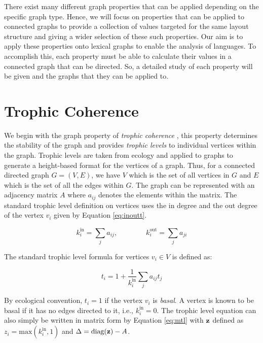 There exist many different graph properties that can be applied depending on the specific graph type. Hence, we will focus on properties that can be applied to connected graphs to provide a collection of values targeted for the same layout structure and giving a wider selection of these such properties. Our aim is to apply these properties onto lexical graphs to enable the analysis of languages. To accomplish this, each property must be able to calculate their values in a connected graph that can be directed. So, a detailed study of each property will be given and the graphs that they can be applied to. 

\section{Trophic Coherence}
We begin with the graph property of \emph{trophic coherence} \cite{johnson2014trophic}, this property determines the stability of the graph and provides \emph{trophic levels} to individual vertices within the graph. Trophic levels are taken from ecology and applied to graphs to generate a height-based format for the vertices of a graph. Thus, for a connected directed graph $G =(V,E)$, we have $V$ which is the set of all vertices in $G$ and $E$ which is the set of all the edges within $G$. The graph can be represented with an adjacency matrix $A$ where $a_{ij}$ denotes the elements within the matrix. The standard trophic level definition on vertices uses the in degree and the out degree of the vertex $v_i$ given by Equation \ref{eq:inoutt}.

\begin{equation} \label{eq:inoutt}
k_i^{\text{in}} = \sum_ja_{ij} , \qquad \qquad k_i^{\text{out}} = \sum_ja_{ji} 
\end{equation}

The standard trophic level formula for vertices $v_i \in V$ is defined as:

\begin{equation}
t_i = 1 + \frac{1}{k_i^{\text{in}}}\sum_ja_{ij}t_j
\end{equation}

By ecological convention, $t_i = 1$ if the vertex $v_i$ is \emph{basal}. A vertex is known to be basal if it has no edges directed to it, i.e., $k_i^{\text{in}} = 0$. The trophic level equation can also simply be written in matrix form by Equation \ref{eq:mtl} with $\bold{z}$ defined as $z_i = \text{max}(k_i^{\text{in}},1)$ and $\Delta = \text{diag}(\bold{z}) - A$.

